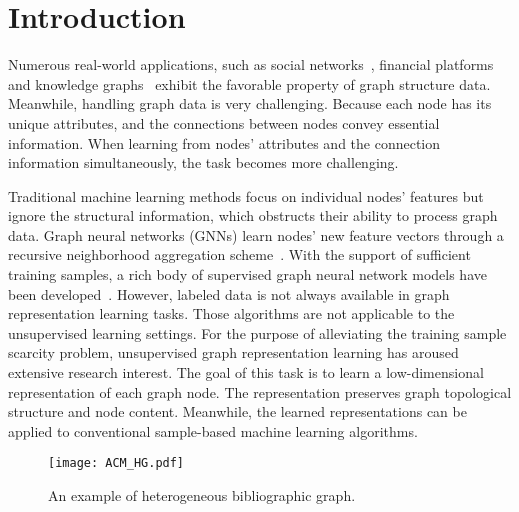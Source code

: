 \documentclass[conference]{IEEEtran}
\begin{document}
	
	
\section{Introduction}
	\label{sec:intro}
Numerous real-world applications, such as social networks~\cite{JZhang19}, financial platforms~\cite{ren2019ensemfdet} and knowledge graphs~\cite{WMWG17} exhibit the favorable property of graph structure data. Meanwhile, handling graph data is very challenging. Because each node has its unique attributes, and the connections between nodes convey essential information. When learning from nodes' attributes and the connection information simultaneously, the task becomes more challenging. 
	
	Traditional machine learning methods focus on individual nodes' features but ignore the structural information, which obstructs their ability to process graph data. Graph neural networks (GNNs) learn nodes' new feature vectors through a recursive neighborhood aggregation scheme~\cite{XHLJ10}. 
	With the support of sufficient training samples, a rich body of supervised graph neural network models have been developed~\cite{KW17,VCCRLB18,YYRHL18}. However, labeled data is not always available in graph representation learning tasks. Those algorithms are not applicable to the unsupervised learning settings. For the purpose of alleviating the training sample scarcity problem, unsupervised graph representation learning has aroused extensive research interest. The goal of this task is to learn a low-dimensional representation of each graph node. The representation preserves graph topological structure and node content. Meanwhile, the learned representations can be applied to conventional sample-based machine learning algorithms.  
\begin{figure}[t]
\centering
		\begin{minipage}[l]{0.8\columnwidth}
			\centering
			\texttt{[image: ACM\_HG.pdf]}
		\end{minipage}
\caption{An example of heterogeneous bibliographic graph.}\label{fig:acmhg}
		\vspace{-20pt}
	\end{figure}
\end{document}
